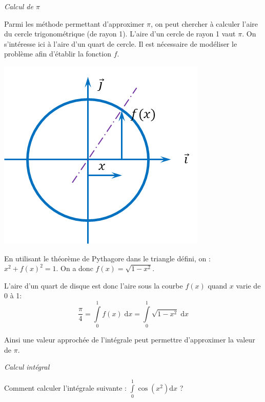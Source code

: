 \documentclass[10pt,fleqn]{article} %
\begin{document}
\begin{exemple}
\textit{Calcul de $\pi$}

\begin{minipage}[c]{.7\linewidth}
Parmi les méthode permettant d'approximer $\pi$, on peut chercher à calculer l'aire du cercle trigonométrique (de rayon 1). L'aire d'un cercle de rayon 1 vaut $\pi$. On s'intéresse ici à l'aire d'un quart de cercle. Il est nécessaire de modéliser le problème afin d'établir la fonction $f$.

\end{minipage}\hfill
\begin{minipage}[c]{.25\linewidth}
\begin{center}
\includegraphics[width=.95\textwidth]{images/cercle}
\end{center}
\end{minipage}

En utilisant le théorème de Pythagore dans le triangle défini, on : $x^2 + f(x)^2 = 1$. On a donc $f(x)=\sqrt{1-x^2}$. 

L'aire d'un quart de disque est donc l'aire sous la courbe $f(x)$ quand $x$ varie de 0 à 1:
$$
\dfrac{\pi}{4}=\int\limits_{0}^1 f(x) \; \mathrm{d} x =\int\limits_{0}^1\sqrt{1-x^2} \; \mathrm{d} x
$$

Ainsi une valeur approchée de l'intégrale peut permettre d'approximer la valeur de $\pi$.
\end{exemple}
 
\begin{exemple}
\textit{Calcul intégral}

Comment calculer l'intégrale suivante : $\int\limits_{0}^1 \cos \left(x^2\right) \mathrm{d} x$ ?
\end{exemple}
\end{document}
